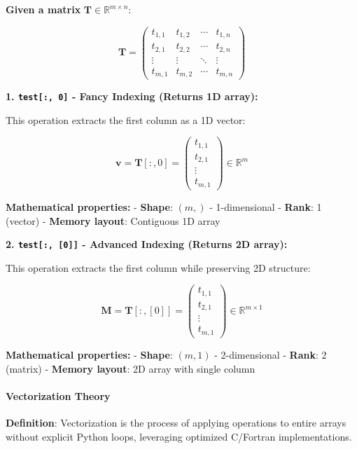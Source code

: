 \documentclass[11pt]{article}
\begin{document}
\textbf{Given a matrix} \(\mathbf{T} \in \mathbb{R}^{m \times n}\):

\[\mathbf{T} = \begin{pmatrix}
t_{1,1} & t_{1,2} & \cdots & t_{1,n} \\
t_{2,1} & t_{2,2} & \cdots & t_{2,n} \\
\vdots & \vdots & \ddots & \vdots \\
t_{m,1} & t_{m,2} & \cdots & t_{m,n}
\end{pmatrix}\]

\textbf{1. \texttt{test{[}:,\ 0{]}} - Fancy Indexing (Returns 1D
array):}

This operation extracts the first column as a 1D vector:

\[\mathbf{v} = \mathbf{T}[:, 0] = \begin{pmatrix} t_{1,1} \\ t_{2,1} \\ \vdots \\ t_{m,1} \end{pmatrix} \in \mathbb{R}^m\]

\textbf{Mathematical properties:} - \textbf{Shape}: \((m,)\) -
1-dimensional - \textbf{Rank}: 1 (vector) - \textbf{Memory layout}:
Contiguous 1D array

\textbf{2. \texttt{test{[}:,\ {[}0{]}{]}} - Advanced Indexing (Returns
2D array):}

This operation extracts the first column while preserving 2D structure:

\[\mathbf{M} = \mathbf{T}[:, [0]] = \begin{pmatrix} t_{1,1} \\ t_{2,1} \\ \vdots \\ t_{m,1} \end{pmatrix} \in \mathbb{R}^{m \times 1}\]

\textbf{Mathematical properties:} - \textbf{Shape}: \((m, 1)\) -
2-dimensional - \textbf{Rank}: 2 (matrix) - \textbf{Memory layout}: 2D
array with single column

\paragraph{Vectorization Theory}\label{vectorization-theory}

\textbf{Definition}: Vectorization is the process of applying operations
to entire arrays without explicit Python loops, leveraging optimized
C/Fortran implementations.
\end{document}
